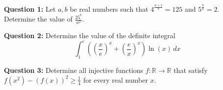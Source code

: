 \documentclass{article}
\begin{document}
	
	\textbf{Question 1:}
	Let \( a, b \) be real numbers such that \( 4^{\frac{a+1}{b}} = 125 \) and \( 5^{\frac{b}{a}} = 2 \). Determine the value of \( \frac{25^b}{a^2} \).
	
	\textbf{Question 2:}
	Determine the value of the definite integral
	\[ \int_{1}^{e} \left( \left(\frac{x}{e}\right)^x + \left(\frac{e}{x}\right)^x \right) \ln(x) \, dx \]
	
	\textbf{Question 3:}
	Determine all injective functions \( f: \mathbb{R} \to \mathbb{R} \) that satisfy \( f(x^2) - (f(x))^2 \geq \frac{1}{4} \) for every real number \( x \).
	
\end{document}
